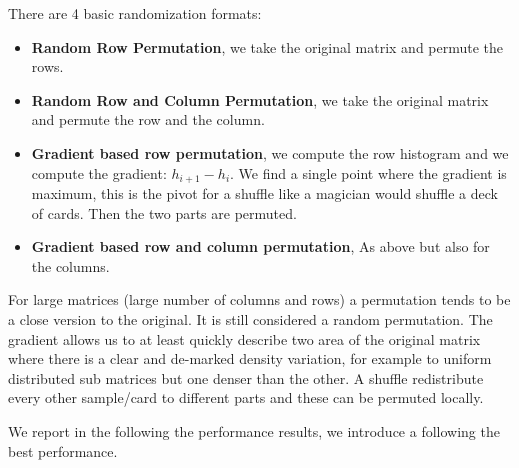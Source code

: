 \documentclass[manuscript,screen]{acmart}
\begin{document}
There are 4 basic randomization formats:
\begin{itemize}
  \item {\bf Random Row Permutation}, we take the original matrix and
    permute the rows.
  \item {\bf Random Row and Column Permutation}, we take the original
    matrix and permute the row and the column.
  \item {\bf Gradient based row permutation}, we compute the row
    histogram and we compute the gradient: $h_{i+1} - h_i$. We find a
    single point where the gradient is maximum, this is the pivot for
    a shuffle like a magician would shuffle a deck of cards.  Then the
    two parts are permuted.
  \item {\bf Gradient based row and column permutation}, As above but
    also for the columns.
\end{itemize}

For large matrices (large number of columns and rows) a permutation
tends to be a close version to the original. It is still considered a
random permutation. The gradient allows us to at least quickly
describe two area of the original matrix where there is a clear and
de-marked density variation, for example to uniform distributed sub
matrices but one denser than the other. A shuffle redistribute every
other sample/card to different parts and these can be permuted
locally.


    
We report in the following the performance results, we introduce a
{\bf *} following the best performance. 

 



%

 

%
\end{document}
